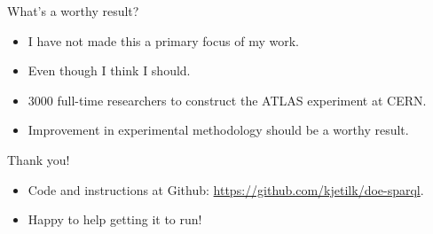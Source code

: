 \documentclass[english,usenames,dvipsnames,aspectratio=169]{beamer}
\begin{document}
\begin{frame}{What's a worthy result?}
  \begin{itemize}
  \item I have not made this a primary focus of my work.
  \item Even though I think I should.
  \item 3000 full-time researchers to construct the ATLAS experiment
    at CERN.
  \item Improvement in experimental methodology should be a worthy result.
  \end{itemize}


\end{frame}


\begin{frame}{Thank you!}

  \begin{itemize}
  \item Code and instructions at Github:
    \url{https://github.com/kjetilk/doe-sparql}.
  \item Happy to help getting it to run!
  \end{itemize}

\end{frame}
\end{document}
